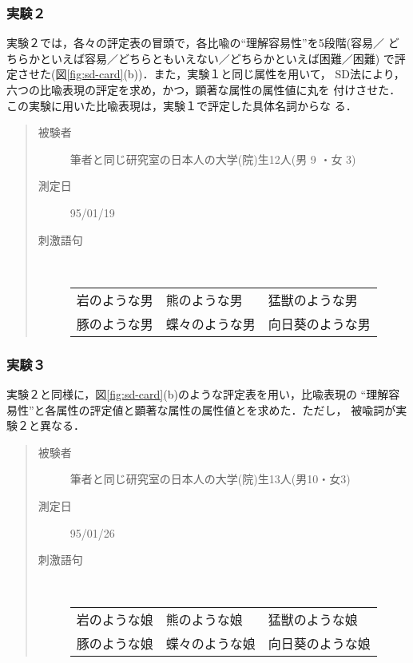 \subsubsection{実験２}

実験２では，各々の評定表の冒頭で，各比喩の``理解容易性''を5段階(容易／
どちらかといえば容易／どちらともいえない／どちらかといえば困難／困難)
で評定させた(図\ref{fig:sd-card}(b))．また，実験１と同じ属性を用いて，
SD法により，六つの比喩表現の評定を求め，かつ，顕著な属性の属性値に丸を
付けさせた．この実験に用いた比喩表現は，実験１で評定した具体名詞からな
る．

\begin{quote}
  \begin{description}
  \item[被験者\hspace{1em}] 筆者と同じ研究室の日本人の大学(院)生12人(男 9 ・女 3)
  \item[測定日\hspace{1em}] 95/01/19  
  \item[刺激語句] \ \\
    \begin{tabular}{lll}
      岩のような男 & 熊のような男 & 猛獣のような男  \\
      豚のような男 & 蝶々のような男 & 向日葵のような男 
    \end{tabular}
  \end{description}
\end{quote}

\subsubsection{実験３}

実験２と同様に，図\ref{fig:sd-card}(b)のような評定表を用い，比喩表現の
``理解容易性''と各属性の評定値と顕著な属性の属性値とを求めた．ただし，
被喩詞が実験２と異なる．

\begin{quote}
  \begin{description}
  \item[被験者\hspace{1em}] 筆者と同じ研究室の日本人の大学(院)生13人(男10・女3)
  \item[測定日\hspace{1em}] 95/01/26
  \item[刺激語句] \ \\
    \begin{tabular}{lll}
      岩のような娘 & 熊のような娘 & 猛獣のような娘  \\
      豚のような娘 & 蝶々のような娘 & 向日葵のような娘 
    \end{tabular}
  \end{description}
\end{quote}

